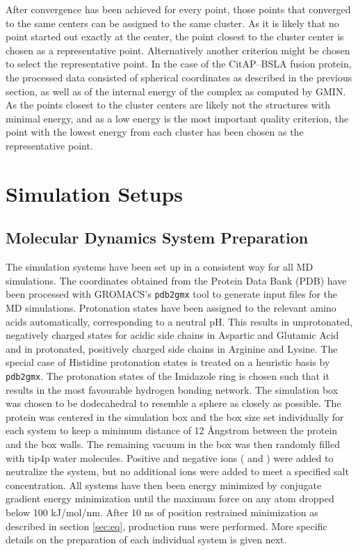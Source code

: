 \documentclass[english, a4paper, 12pt, titlepage, draft]{article}
\begin{document}
After convergence has been achieved for every point, those points that converged to the same centers can be assigned to the same cluster.
As it is likely that no point started out exactly at the center, the point closest to the cluster center is chosen as a representative point.
Alternatively another criterion might be chosen to select the representative point.
In the case of the CitAP--BSLA fusion protein, the processed data consisted of spherical coordinates as described in the previous section, as well as of the internal energy of the complex as computed by GMIN.
As the points closest to the cluster centers are likely not the structures with minimal energy, and as a low energy is the most important quality criterion, the point with the lowest energy from each cluster has been chosen as the representative point.



\section{Simulation Setups}

\subsection{Molecular Dynamics System Preparation}

The simulation systems have been set up in a consistent way for all MD simulations.
The coordinates obtained from the Protein Data Bank (PDB) have been processed with GROMACS's \texttt{pdb2gmx} tool to generate input files for the MD simulations.
Protonation states have been assigned to the relevant amino acids automatically, corresponding to a neutral pH.
This results in unprotonated, negatively charged states for acidic side chains in Aspartic and Glutamic Acid and in protonated, positively charged side chains in Arginine and Lysine.
The special case of Histidine protonation states is treated on a heuristic basis by \texttt{pdb2gmx}.
The protonation states of the Imidazole ring is chosen such that it results in the most favourable hydrogen bonding network.
The simulation box was chosen to be dodecahedral to resemble a sphere as closely as possible.
The protein was centered in the simulation box and the box size set individually for each system to keep a minimum distance of 12 \r{A}ngstrom between the protein and the box walls.
The remaining vacuum in the box was then randomly filled with tip4p water molecules.
Positive and negative ions ( and ) were added to neutralize the system, but no additional ions were added to meet a specified salt concentration.
All systems have then been energy minimized by conjugate gradient energy minimization until the maximum force on any atom dropped below 100 kJ/mol/nm.
After 10 ns of position restrained minimization as described in section \ref{sec:eq}, production runs were performed.
More specific details on the preparation of each individual system is given next.
\end{document}
